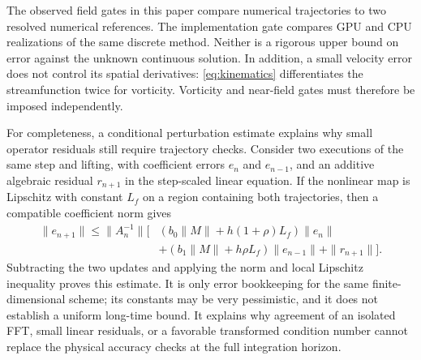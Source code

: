 The observed field gates in this paper compare numerical trajectories
to two resolved numerical references. The implementation gate compares
GPU and CPU realizations of the same discrete method. Neither is a
rigorous upper bound on error against the unknown continuous
solution. In addition, a small velocity error does not control its
spatial derivatives: \eqref{eq:kinematics} differentiates the
streamfunction twice for vorticity. Vorticity and near-field gates
must therefore be imposed independently.

For completeness, a conditional perturbation estimate explains why
small operator residuals still require trajectory checks. Consider
two executions of the same step and lifting, with coefficient errors
\(e_n\) and \(e_{n-1}\), and an additive algebraic residual
\(r_{n+1}\) in the step-scaled linear equation. If the nonlinear
map is Lipschitz with constant \(L_f\) on a region containing both
trajectories, then a compatible coefficient norm gives
\begin{equation}
\begin{aligned}
 \|e_{n+1}\|\leq\|A_n^{-1}\|\big[&
 (b_0\|M\|+h(1+\rho)L_f)\|e_n\|\\
 &+(b_1\|M\|+h\rho L_f)\|e_{n-1}\|
 +\|r_{n+1}\|\big].
\end{aligned}
 \label{eq:perturbation-accounting}
\end{equation}
Subtracting the two updates and applying the norm and local Lipschitz
inequality proves this estimate. It is only error bookkeeping for
the same finite-dimensional scheme; its constants may be very
pessimistic, and it does not establish a uniform long-time bound.
It explains why agreement of an isolated FFT, small linear residuals,
or a favorable transformed condition number cannot replace the
physical accuracy checks at the full integration horizon.
